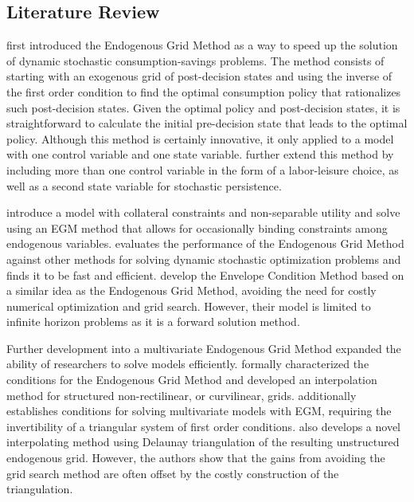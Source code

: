 \documentclass[\econtexRoot/SequentialEGM]{subfiles}
\begin{document}
\subsection{Literature Review} %


\cite{Carroll2006-wq} first introduced the Endogenous Grid Method as a way to speed up the solution of dynamic stochastic consumption-savings problems. The method consists of starting with an exogenous grid of post-decision states and using the inverse of the first order condition to find the optimal consumption policy that rationalizes such post-decision states. Given the optimal policy and post-decision states, it is straightforward to calculate the initial pre-decision state that leads to the optimal policy. Although this method is certainly innovative, it only applied to a model with one control variable and one state variable. \cite{Barillas2007-uh} further extend this method by including more than one control variable in the form of a labor-leisure choice, as well as a second state variable for stochastic persistence.

\cite{Hintermaier2010-io} introduce a model with collateral constraints and non-separable utility and solve using an EGM method that allows for occasionally binding constraints among endogenous variables. \cite{Jorgensen2013-du} evaluates the performance of the Endogenous Grid Method against other methods for solving dynamic stochastic optimization problems and finds it to be fast and efficient. \cite{Maliar2013-sv} develop the Envelope Condition Method based on a similar idea as the Endogenous Grid Method, avoiding the need for costly numerical optimization and grid search. However, their model is limited to infinite horizon problems as it is a forward solution method.

Further development into a multivariate Endogenous Grid Method expanded the ability of researchers to solve models efficiently. \cite{White2015-fg} formally characterized the conditions for the Endogenous Grid Method and developed an interpolation method for structured non-rectilinear, or curvilinear, grids. \cite{Iskhakov2015-jy} additionally establishes conditions for solving multivariate models with EGM, requiring the invertibility of a triangular system of first order conditions. \cite{Ludwig2018-uz} also develops a novel interpolating method using Delaunay triangulation of the resulting unstructured endogenous grid. However, the authors show that the gains from avoiding the grid search method are often offset by the costly construction of the triangulation.
\end{document}
